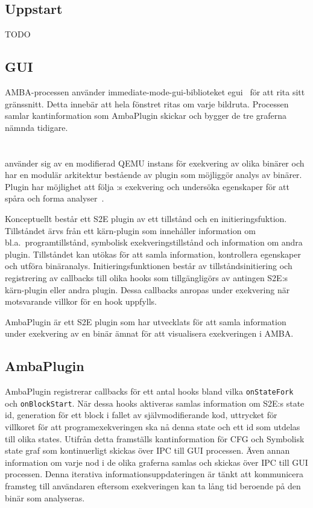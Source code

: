\subsection{Uppstart}

TODO

\subsection{GUI}

AMBA-processen använder immediate-mode-gui-biblioteket egui~\cite{egui} för att
rita sitt gränssnitt. Detta innebär att hela fönstret ritas om varje bildruta.
Processen samlar kantinformation som AmbaPlugin skickar och bygger de tre
graferna nämnda tidigare.

\section{\stoe{}}

\stoe{} använder sig av en modifierad QEMU instans för exekvering av olika
binärer och har en modulär arkitektur bestående av plugin som möjliggör analys
av binärer. Plugin har möjlighet att följa \stoe{}:s exekvering och undersöka
egenskaper för att spåra och forma analyser~\cite{Chipounov12}.

Konceptuellt består ett S2E plugin av ett tillstånd och en initieringsfuktion.
Tillståndet ärvs från ett kärn-plugin som innehåller information om bl.a.\
programtillstånd, symbolisk exekveringstillstånd och information om andra
plugin. Tillståndet kan utökas för att samla information, kontrollera egenskaper
och utföra binäranalys. Initieringsfunktionen består av tillståndsinitiering och
registrering av callbacks till olika hooks som tillgängligörs av antingen S2E:s
kärn-plugin eller andra plugin. Dessa callbacks anropas under exekvering när
motsvarande villkor för en hook uppfylls.

AmbaPlugin är ett S2E plugin som har utvecklats för att samla information under
exekvering av en binär ämnat för att visualisera exekveringen i AMBA.\@

\subsection{AmbaPlugin}

AmbaPlugin registrerar callbacks för ett antal hooks bland vilka
\texttt{onStateFork} och \texttt{onBlockStart}. När dessa hooks aktiveras
samlas information om S2E:s state id, generation för ett block i fallet av
självmodifierande kod, uttrycket för villkoret för att programexekveringen ska
nå denna state och ett id som utdelas till olika states. Utifrån detta
framställs kantinformation för CFG och Symbolisk state graf som kontinuerligt
skickas över IPC till GUI processen. Även annan information om varje nod i de
olika graferna samlas och skickas över IPC till GUI processen. Denna iterativa
informationsuppdateringen är tänkt att kommunicera framsteg till användaren
eftersom exekveringen kan ta lång tid beroende på den binär som analyseras.


